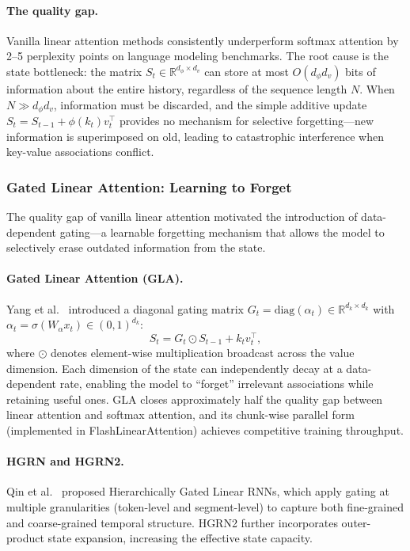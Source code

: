 \paragraph{The quality gap.}
Vanilla linear attention methods consistently underperform softmax attention by 2--5 perplexity points on language modeling benchmarks. The root cause is the state bottleneck: the matrix $S_t \in \mathbb{R}^{d_\phi \times d_v}$ can store at most $O(d_\phi d_v)$ bits of information about the entire history, regardless of the sequence length $N$. When $N \gg d_\phi d_v$, information must be discarded, and the simple additive update $S_t = S_{t-1} + \phi(k_t) v_t^\top$ provides no mechanism for selective forgetting---new information is superimposed on old, leading to catastrophic interference when key-value associations conflict.

\subsubsection{Gated Linear Attention: Learning to Forget}

The quality gap of vanilla linear attention motivated the introduction of data-dependent gating---a learnable forgetting mechanism that allows the model to selectively erase outdated information from the state.

\paragraph{Gated Linear Attention (GLA).}
Yang et al.~\cite{yang2024gla} introduced a diagonal gating matrix $G_t = \text{diag}(\alpha_t) \in \mathbb{R}^{d_k \times d_k}$ with $\alpha_t = \sigma(W_\alpha x_t) \in (0, 1)^{d_k}$:
\begin{equation}
S_t = G_t \odot S_{t-1} + k_t v_t^\top,
\label{eq:gla}
\end{equation}
where $\odot$ denotes element-wise multiplication broadcast across the value dimension. Each dimension of the state can independently decay at a data-dependent rate, enabling the model to ``forget'' irrelevant associations while retaining useful ones. GLA closes approximately half the quality gap between linear attention and softmax attention, and its chunk-wise parallel form (implemented in FlashLinearAttention) achieves competitive training throughput.

\paragraph{HGRN and HGRN2.}
Qin et al.~\cite{qin2023hgrn, qin2024hgrn2} proposed Hierarchically Gated Linear RNNs, which apply gating at multiple granularities (token-level and segment-level) to capture both fine-grained and coarse-grained temporal structure. HGRN2 further incorporates outer-product state expansion, increasing the effective state capacity.

